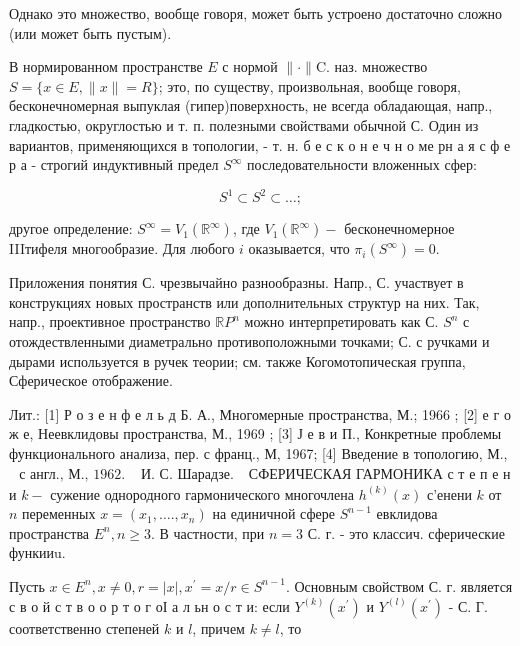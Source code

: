 \documentclass[10pt]{article}
\begin{document}
Однако это множество, вообще говоря, может быть устроено достаточно сложно (или может быть пустым).



В нормированном пространстве $E$ с нормой $\|\cdot\| \mathrm{C}$. наз. множество $S=\{x \in E,\|x\|=R\}$; это, по существу, произвольная, вообще говоря, бесконечномерная выпуклая (гипер)поверхность, не всегда обладающая, напр., гладкостью, округлостью и т. п. полезными свойствами обычной С. Один из вариантов, применяющихся в топологии, - т. н. б е с к о н е ч н о ме рн а я с ф е р а - строгий индуктивный предел $S^{\infty}$ последовательности вложенных сфер:



\[

S^{1} \subset S^{2} \subset \ldots ;

\]



другое определение: $S^{\infty}=V_{1}\left(\mathbb{R}^{\infty}\right)$, где $V_{1}\left(\mathbb{R}^{\infty}\right)-$ бесконечномерное IIIтифеля многообразие. Для любого $i$ оказывается, что $\pi_{i}\left(S^{\infty}\right)=0$.



Приложения понятия С. чрезвычайно разнообразны. Напр., С. участвует в конструкциях новых пространств или дополнительных структур на них. Так, напр., проективное пространство $\mathbb{R} P^{n}$ можно интерпретировать как С. $S^{n}$ с отождествленными диаметрально противоположными точками; С. с ручками и дырами используется в ручек теории; см. также Когомотопическая группа, Сферическое отображение.



Лит.: [1] Р о з е н ф е л ь д Б. А., Многомерные пространства, М.; 1966 ; [2] е г о ж е, Неевклидовы пространства, М., 1969 ; [3] Ј е в и П., Конкретные проблемы функционального анализа, пер. с франц., М, 1967; [4] Введение в топологию, М., $\begin{array}{ll}\text { с англ., М., } 1962 . & \text { И. С. Шарадзе. }\end{array}$ СФЕРИЧЕСКАЯ ГАРМОНИКА с т е п е н и $k-$ сужение однородного гармонического многочлена $h^{(k)}(x)$ с'енени $k$ от $n$ переменных $x=\left(x_{1}, \ldots ., x_{n}\right)$ на единичной сфере $S^{n-1}$ евклидова пространства $E^{n}, n \geqslant 3$. В частности, при $n=3$ С. г. - это классич. сферические функииu.



Пусть $x \in E^{n}, x \neq 0, r=|x|, x^{\prime}=x / r \in S^{n-1}$. Основным свойством С. г. является с в о й с т в о о р т о г оІ а л ьн о с т и: если $Y^{(k)}\left(x^{\prime}\right)$ и $Y^{(l)}\left(x^{\prime}\right)$ - С. Г. соответственно степеней $k$ и $l$, причем $k \neq l$, то
\end{document}
